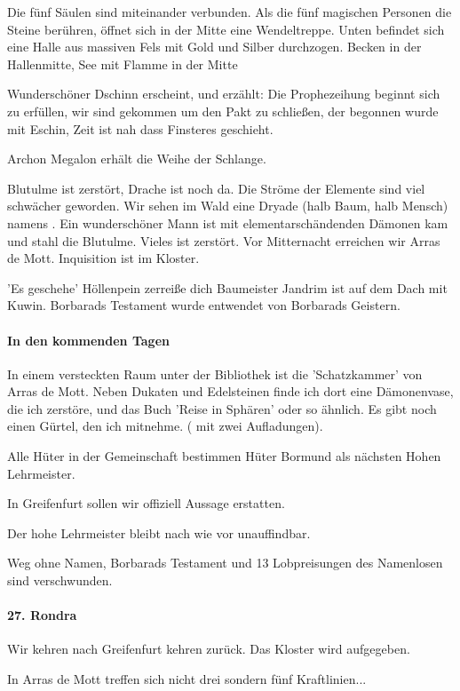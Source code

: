 Die fünf Säulen sind miteinander verbunden. Als die fünf magischen Personen die Steine berühren, öffnet sich in der Mitte eine Wendeltreppe. Unten befindet sich eine Halle aus massiven Fels mit Gold und Silber durchzogen. Becken in der Hallenmitte, See mit Flamme in der Mitte   

Wunderschöner Dschinn erscheint, und erzählt: Die Prophezeihung beginnt sich zu erfüllen, wir sind gekommen um den Pakt zu schließen, der begonnen wurde mit Eschin, Zeit ist nah dass Finsteres geschieht.  

Archon Megalon erhält die Weihe der Schlange. 

Blutulme ist zerstört, Drache ist noch da. Die Ströme der Elemente sind viel schwächer geworden. Wir sehen im Wald eine Dryade (halb Baum, halb Mensch) namens . Ein wunderschöner Mann ist mit elementarschändenden Dämonen kam und stahl die Blutulme. Vieles ist zerstört. Vor Mitternacht erreichen wir Arras de Mott. Inquisition ist im Kloster.  

'Es geschehe'
Höllenpein zerreiße dich 
Baumeister Jandrim ist auf dem Dach mit Kuwin. Borbarads Testament wurde entwendet von Borbarads Geistern. 

\paragraph{In den kommenden Tagen}

In einem versteckten Raum unter der Bibliothek ist die 'Schatzkammer' von Arras de Mott. Neben Dukaten und Edelsteinen finde ich dort eine Dämonenvase, die ich zerstöre, und das Buch 'Reise in Sphären' oder so ähnlich. Es gibt noch einen Gürtel, den ich mitnehme. ( mit zwei Aufladungen).

Alle Hüter in der Gemeinschaft bestimmen Hüter Bormund als nächsten Hohen Lehrmeister.  

In Greifenfurt sollen wir offiziell Aussage erstatten. 

Der hohe Lehrmeister bleibt nach wie vor unauffindbar. 

Weg ohne Namen, Borbarads Testament und 13 Lobpreisungen des Namenlosen sind verschwunden. 

\paragraph{27. Rondra}
Wir kehren nach Greifenfurt kehren zurück. Das Kloster wird aufgegeben. 

In Arras de Mott treffen sich nicht drei sondern fünf Kraftlinien...

